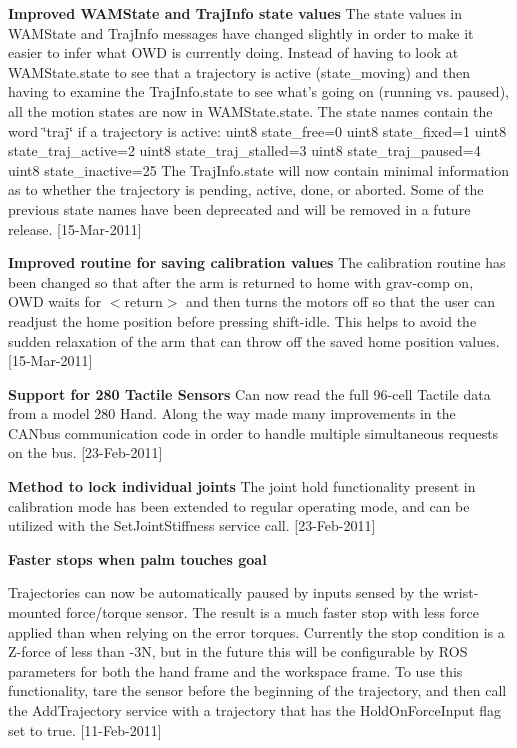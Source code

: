 {\bfseries Improved W\-A\-M\-State and Traj\-Info state values} The state values in W\-A\-M\-State and Traj\-Info messages have changed slightly in order to make it easier to infer what O\-W\-D is currently doing. Instead of having to look at W\-A\-M\-State.\-state to see that a trajectory is active (state\-\_\-moving) and then having to examine the Traj\-Info.\-state to see what's going on (running vs. paused), all the motion states are now in W\-A\-M\-State.\-state. The state names contain the word \char`\"{}traj\char`\"{} if a trajectory is active\-: uint8 state\-\_\-free=0 uint8 state\-\_\-fixed=1 uint8 state\-\_\-traj\-\_\-active=2 uint8 state\-\_\-traj\-\_\-stalled=3 uint8 state\-\_\-traj\-\_\-paused=4 uint8 state\-\_\-inactive=25 The Traj\-Info.\-state will now contain minimal information as to whether the trajectory is pending, active, done, or aborted. Some of the previous state names have been deprecated and will be removed in a future release. \mbox{[}15-\/\-Mar-\/2011\mbox{]}

{\bfseries Improved routine for saving calibration values} The calibration routine has been changed so that after the arm is returned to home with grav-\/comp on, O\-W\-D waits for $<$return$>$ and then turns the motors off so that the user can readjust the home position before pressing shift-\/idle. This helps to avoid the sudden relaxation of the arm that can throw off the saved home position values. \mbox{[}15-\/\-Mar-\/2011\mbox{]}

{\bfseries Support for 280 Tactile Sensors} Can now read the full 96-\/cell Tactile data from a model 280 Hand. Along the way made many improvements in the C\-A\-Nbus communication code in order to handle multiple simultaneous requests on the bus. \mbox{[}23-\/\-Feb-\/2011\mbox{]}

{\bfseries Method to lock individual joints} The joint hold functionality present in calibration mode has been extended to regular operating mode, and can be utilized with the Set\-Joint\-Stiffness service call. \mbox{[}23-\/\-Feb-\/2011\mbox{]}

{\bfseries Faster stops when palm touches goal}\par
 Trajectories can now be automatically paused by inputs sensed by the wrist-\/mounted force/torque sensor. The result is a much faster stop with less force applied than when relying on the error torques. Currently the stop condition is a Z-\/force of less than -\/3\-N, but in the future this will be configurable by R\-O\-S parameters for both the hand frame and the workspace frame. To use this functionality, tare the sensor before the beginning of the trajectory, and then call the Add\-Trajectory service with a trajectory that has the Hold\-On\-Force\-Input flag set to true. \mbox{[}11-\/\-Feb-\/2011\mbox{]}

